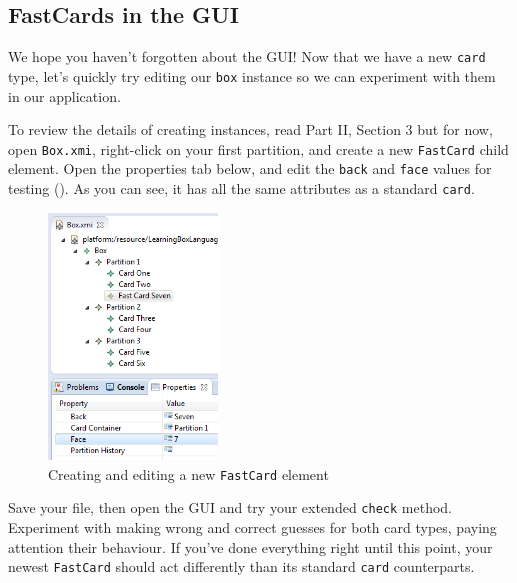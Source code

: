 \newpage
\hypertarget{subsec:fastGUI}{}
\subsection{FastCards in the GUI}
\genHeader

We hope you haven't forgotten about the GUI! Now that we have a new \texttt{card} type, let's quickly try editing our \texttt{box} instance so we can experiment
with them in our application.

\begin{stepbystep}
  
\item To review the details of creating instances, read Part II, Section 3 but for now, open \texttt{Box.xmi}, right-click on your
first partition, and create a new \texttt{FastCard} child element. Open the properties tab below, and edit the \texttt{back} and \texttt{face} values for
testing (). As you can see, it has all the same attributes as a standard \texttt{card}.

\vspace{0.5cm}

\begin{figure}[htbp]
\begin{center}
  \includegraphics[width=0.4\textwidth]{eclipse_fastCardProperties}
  \caption{Creating and editing a new \texttt{FastCard} element}  
  \label{eclipse:fastCardProperties}
\end{center}
\end{figure}

\item Save your file, then open the GUI and try your extended \texttt{check} method. Experiment with making wrong and correct
guesses for both card types, paying attention their behaviour. If you've done everything right until this point, your newest \texttt{FastCard} should act
differently than its standard \texttt{card} counterparts.

\end{stepbystep}
